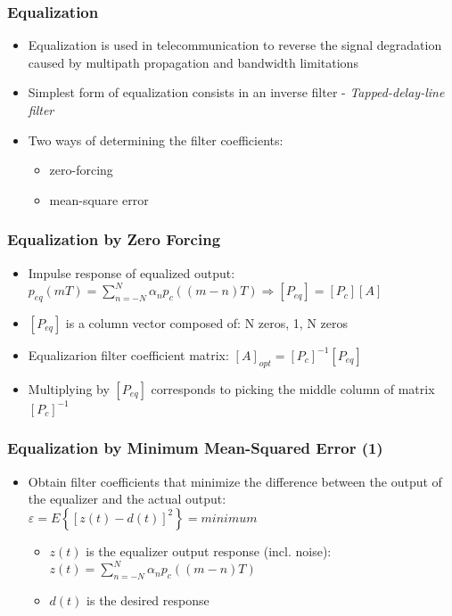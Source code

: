 \documentclass{beamer}
\begin{document}
\begin{frame}
	\frametitle{Equalization}
	\begin{itemize}
		\item Equalization is used in telecommunication to reverse the signal degradation caused by multipath propagation and bandwidth limitations
		\item Simplest form of equalization consists in an inverse filter - \emph{Tapped-delay-line filter}
		\item Two ways of determining the filter coefficients:
		\begin{itemize}
			\item zero-forcing
			\item mean-square error
		\end{itemize}
	\end{itemize}
\end{frame}

\begin{frame}
	\frametitle{Equalization by Zero Forcing}
	\begin{itemize}
		\item Impulse response of equalized output: $ p_{eq}(mT) = \sum_{n=-N}^N {\alpha_n p_c((m-n)T)} \Rightarrow [P_{eq}]=[P_c][A] $
		\item $ [P_{eq}] $ is a column vector composed of: N zeros, 1, N zeros
		\item Equalizarion filter coefficient matrix: $ [A]_{opt} = [P_c]^{-1}[P_{eq}] $
		\item Multiplying by $ [P_{eq}] $ corresponds to picking the middle column of matrix $ [P_c]^{-1} $
	\end{itemize}
\end{frame}

\begin{frame}
	\frametitle{Equalization by Minimum Mean-Squared Error (1)}
	\begin{itemize}
		\item Obtain filter coefficients that minimize the difference between the output of the equalizer and the actual output: $ \varepsilon = E\left\{[z(t) - d(t)]^2\right\} = minimum $
		\begin{itemize}
			\item $ z(t) $ is the equalizer output response (incl. noise): $ z(t) = \sum_{n=-N}^N {\alpha_n p_c((m-n)T)} $
			\item $ d(t) $ is the desired response
		\end{itemize}
	\end{itemize}
\end{frame}
\end{document}
